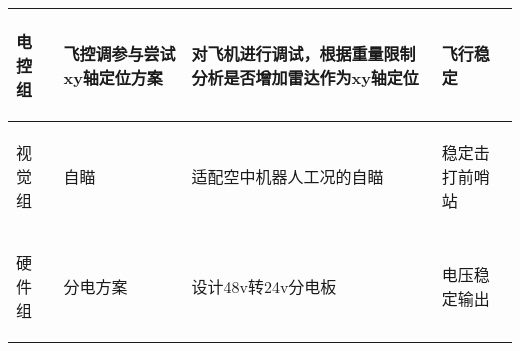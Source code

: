 \begin{longtable}{ p{1.5cm} | p{3cm} | p{6cm} | p{4.3cm} |}
       \begin{center}
           电控组
       \end{center} &
       \begin{center}
           飞控调参与尝试xy轴定位方案
       \end{center} &
       \begin{center}
           对飞机进行调试，根据重量限制分析是否增加雷达作为xy轴定位
       \end{center} &
       \begin{center}
           飞行稳定
       \end{center} \\
        
    \hline
    
        \begin{center}
            视觉组
        \end{center}&
        \begin{center}
            自瞄
        \end{center}&
        \begin{center}
            适配空中机器人工况的自瞄
        \end{center}&
        \begin{center}
            稳定击打前哨站
        \end{center}\\

    \hline
    

       \begin{center}
           硬件组
       \end{center} &
       \begin{center}
           分电方案
       \end{center} &
       \begin{center}
           设计48v转24v分电板
       \end{center} &
       \begin{center}
           电压稳定输出
       \end{center} \\

    \hline
    
\end{longtable}
